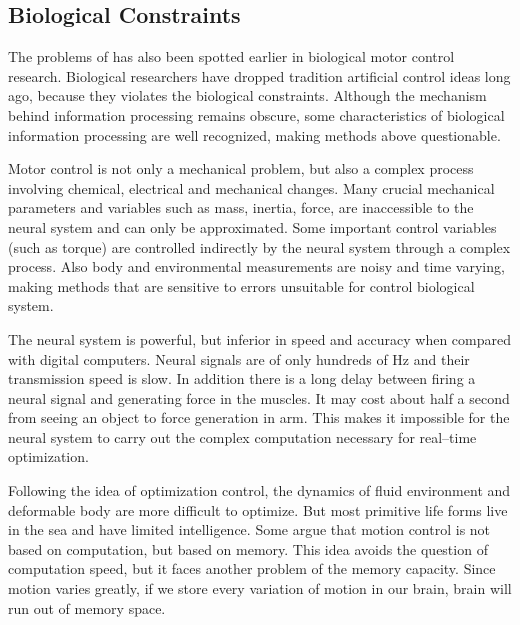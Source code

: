 \subsection{Biological Constraints}
The problems of \cms has also been spotted earlier in biological motor control research.
Biological researchers have dropped  tradition artificial control ideas long ago, because they  violates the biological constraints.
Although the mechanism behind information processing remains obscure, some characteristics of biological information processing are well recognized,  making  \cms methods above questionable\citep{Glynn2003}. 
  
\begin{itemize}
Motor control is not only a mechanical problem, but also a complex process involving chemical, electrical and mechanical changes.
Many crucial mechanical parameters and variables such as mass, inertia, force, are inaccessible to the neural system and can only be approximated. 
Some important control variables (such as torque) are controlled indirectly by the neural system through a complex process.
Also body and environmental measurements are noisy and time varying, making methods that are  sensitive to errors unsuitable for control biological system.

The neural system is powerful, but inferior in speed and accuracy when compared with digital computers. 
Neural signals are of only hundreds of Hz and their transmission speed is slow.
In addition there is a long delay between firing a neural signal and generating force in the muscles.
It may cost about half a second from seeing an object to force generation in arm. 
This makes it impossible for the neural system to carry out the complex computation necessary for real–time optimization.


Following the idea of optimization control, the dynamics of fluid environment and deformable body are more difficult to optimize. 
But most primitive life forms live in the sea and have limited intelligence. 
Some argue that motion control is not based on computation, but based on memory.
This idea avoids the question of computation speed, but it faces another problem of the memory capacity. 
Since motion varies greatly, if we store every variation of motion in our brain, brain will run out of memory space.

\end{itemize}

